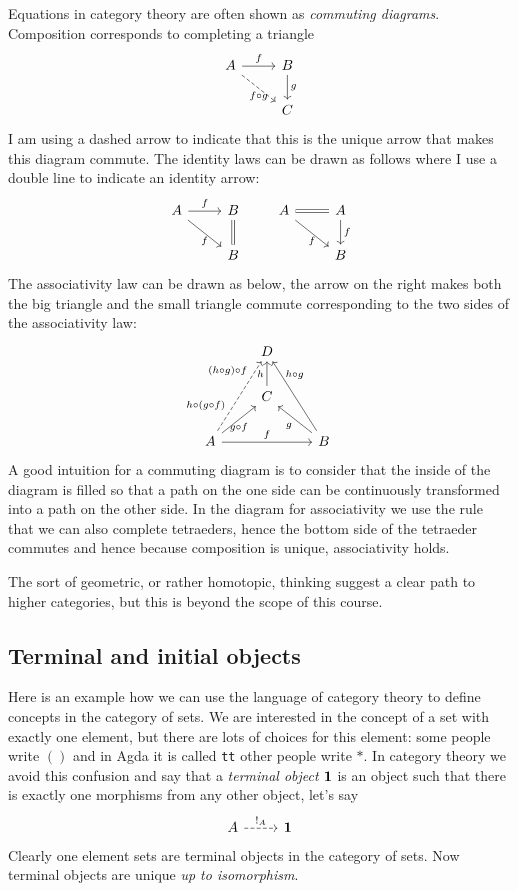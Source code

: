 \documentclass{article}
\begin{document}
Equations in category theory are often shown as \emph{commuting diagrams}. Composition corresponds to completing a triangle
\[\begin{tikzcd}
A \arrow[rd, dashrightarrow,"f\circ g" below] \arrow[r,"f"] & B \arrow[d,"g"]\\
& C
\end{tikzcd}
\]
I am using a dashed arrow to indicate that this is the unique arrow that makes this diagram commute. 
The identity laws can be drawn as follows where I use a double line to indicate an identity arrow:
\[\begin{tikzcd}
A \arrow[rd,"f" below] \arrow[r,"f"] & B \arrow[d,equal]\\
& B
\end{tikzcd}
\qquad
\begin{tikzcd}
A \arrow[rd,"f" below] \arrow[r,equal] & A \arrow[d,"f"]\\
& B
\end{tikzcd}
\]
The associativity law can be drawn as below, the arrow on the right makes both the big triangle and the small triangle commute corresponding to the two sides of the associativity law:
\[\begin{tikzcd}
    & D  &\\
   & C  \arrow[u,"h"] & \\
A \arrow[ur,"g \circ f" below]\arrow[rr,"f"] 
\arrow[uur,dashrightarrow,"h \circ(g \circ f)" near start,"(h\circ g)\circ f" near end] &     & B \arrow[ul,"g"]\arrow[uul,"h \circ g" above=10]
\end{tikzcd}
\]
A good intuition for a commuting diagram is to consider that the inside of the diagram is filled so that a path on the one side can be continuously transformed into a path on the other side. In the diagram for associativity we use the rule that we can also complete tetraeders, hence the bottom side of the tetraeder commutes and hence because composition is unique, associativity holds.

The sort of geometric, or rather homotopic, thinking suggest a clear path to higher categories, but this is beyond the scope of this course.

\subsection{Terminal and initial objects}
\label{sec:term-init-objects}

Here is an example how we can use the language of category theory to define concepts in the category of sets. We are interested in the concept of a set with exactly one element, but there are lots of choices for this element: some people write $()$ and in Agda it is called \texttt{tt} other people write $*$. In category theory we avoid this confusion and say that a \emph{terminal object} $\bf{1}$ is an object such that there is exactly one morphisms from any other object, let's say 
\[\begin{tikzcd}
  A \arrow[r, dashrightarrow, "!_A"] & \bf{1}
\end{tikzcd}\]
Clearly one element sets are terminal objects in the category of sets. Now terminal objects are unique \emph{up to isomorphism}. 
\end{document}
